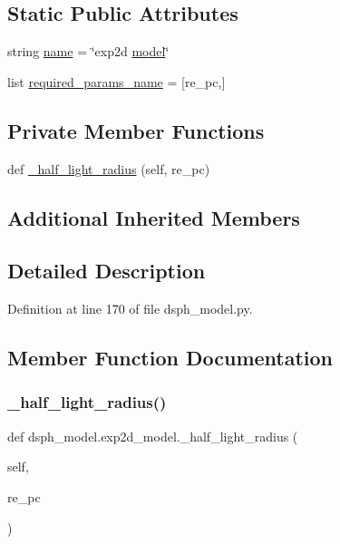 \subsection*{Static Public Attributes}
\begin{DoxyCompactItemize}
\item 
string \hyperlink{classdsph__model_1_1exp2d__model_a172eee0bbbeb483d5253ec3b426e92e7}{name} = \char`\"{}exp2d \hyperlink{classdsph__model_1_1model}{model}\char`\"{}
\item 
list \hyperlink{classdsph__model_1_1exp2d__model_a13fbfe2cc261b70c40dc6635f409f837}{required\+\_\+params\+\_\+name} = \mbox{[}\textquotesingle{}re\+\_\+pc\textquotesingle{},\mbox{]}
\end{DoxyCompactItemize}
\subsection*{Private Member Functions}
\begin{DoxyCompactItemize}
\item 
def \hyperlink{classdsph__model_1_1exp2d__model_a8dc3dcfaa3f876ecf299acece3f6d518}{\+\_\+half\+\_\+light\+\_\+radius} (self, re\+\_\+pc)
\end{DoxyCompactItemize}
\subsection*{Additional Inherited Members}


\subsection{Detailed Description}


Definition at line 170 of file dsph\+\_\+model.\+py.



\subsection{Member Function Documentation}
\mbox{\label{classdsph__model_1_1exp2d__model_a8dc3dcfaa3f876ecf299acece3f6d518}} 
\subsubsection{\texorpdfstring{\+\_\+half\+\_\+light\+\_\+radius()}{\_half\_light\_radius()}}
{\footnotesize\ttfamily def dsph\+\_\+model.\+exp2d\+\_\+model.\+\_\+half\+\_\+light\+\_\+radius (\begin{DoxyParamCaption}\item[{}]{self,  }\item[{}]{re\+\_\+pc }\end{DoxyParamCaption})\hspace{0.3cm}{\ttfamily [private]}}



